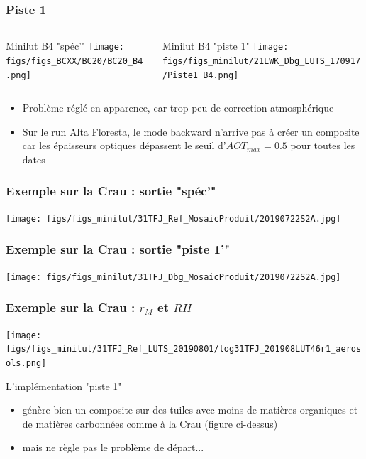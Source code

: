 \documentclass[8pt]{beamer}
\begin{document}
\begin{frame}
\frametitle{Piste 1}
	\begin{columns}
		\begin{column}{0.5\textwidth}
			\begin{center}
				Minilut B4 "spéc'"
		     	\texttt{[image: figs/figs\_BCXX/BC20/BC20\_B4.png]}
		    \end{center}		
		    
		\end{column}
		\begin{column}{0.5\textwidth}
			\begin{center}
				Minilut B4 "piste 1"	
				\texttt{[image: figs/figs\_minilut/21LWK\_Dbg\_LUTS\_170917/Piste1\_B4.png]}
		    \end{center}
		\end{column}
	\end{columns}
	\begin{itemize}
		\item Problème réglé en apparence, car trop peu de correction atmosphérique
		\item Sur le run Alta Floresta, le mode backward n'arrive pas à créer un composite car les épaisseurs optiques dépassent le seuil d'$AOT_{max} = 0.5$ pour toutes les dates
	\end{itemize}
\end{frame}

\begin{frame}
\frametitle{Exemple sur la Crau : sortie "spéc'"}
			\begin{center}
		     	\texttt{[image: figs/figs\_minilut/31TFJ\_Ref\_MosaicProduit/20190722S2A.jpg]}
		    \end{center}		
\end{frame}

\begin{frame}
\frametitle{Exemple sur la Crau : sortie "piste 1'"}
	\begin{center}
     	\texttt{[image: figs/figs\_minilut/31TFJ\_Dbg\_MosaicProduit/20190722S2A.jpg]}
    \end{center}		
\end{frame}

\begin{frame}
\frametitle{Exemple sur la Crau : $r_{M}$ et $RH$}
	\texttt{[image: figs/figs\_minilut/31TFJ\_Ref\_LUTS\_20190801/log31TFJ\_201908LUT46r1\_aerosols.png]}

	L'implémentation "piste 1"
	\begin{itemize}
		\item génère bien un composite sur des tuiles avec moins de matières organiques et de matières carbonnées comme à la Crau (figure ci-dessus)
		\item mais ne règle pas le problème de départ...
	\end{itemize}
\end{frame}
\end{document}
